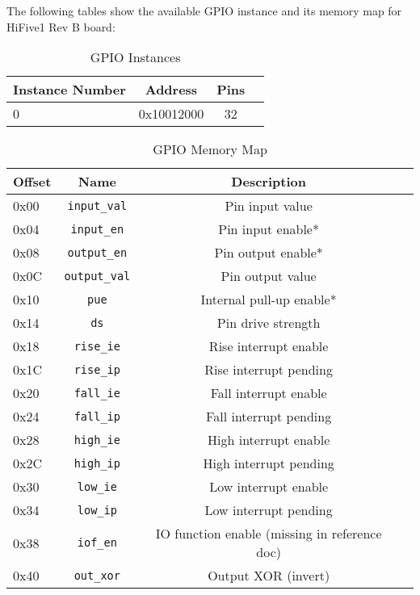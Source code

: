 The following tables show the available GPIO instance and its memory map for HiFive1 Rev B board:
\begin{table}[H]
    \centering
    \begin{tabular}{| p{3cm} | c | c | p{3cm} |}
        \hline
        \textbf{Instance Number} & \textbf{Address} & \textbf{Pins}\\
        \hline
        \hline
        0 & 0x10012000 & 32\\
        \hline
    \end{tabular}
    \caption{GPIO Instances}
\end{table}

\begin{table}[H]
    \centering
    \begin{tabular}{| p{3cm} | c | c | p{3cm} |}
        \hline
        \textbf{Offset} & \textbf{Name} & \textbf{Description}\\
        \hline
        \hline
        0x00 & \lstinline|input_val| & Pin input value\\
        0x04 & \lstinline|input_en| & Pin input enable*\\
        0x08 & \lstinline|output_en| & Pin output enable*\\
        0x0C & \lstinline|output_val| & Pin output value\\
        0x10 & \lstinline|pue| & Internal pull-up enable*\\
        0x14 & \lstinline|ds| & Pin drive strength\\
        0x18 & \lstinline|rise_ie| & Rise interrupt enable\\
        0x1C & \lstinline|rise_ip| & Rise interrupt pending\\
        0x20 & \lstinline|fall_ie| & Fall interrupt enable\\
        0x24 & \lstinline|fall_ip| & Fall interrupt pending\\
        0x28 & \lstinline|high_ie| & High interrupt enable\\
        0x2C & \lstinline|high_ip| & High interrupt pending\\
        0x30 & \lstinline|low_ie| & Low interrupt enable\\
        0x34 & \lstinline|low_ip| & Low interrupt pending\\
        0x38 & \lstinline|iof_en| & IO function enable (missing in reference doc)\\
        0x40 & \lstinline|out_xor| & Output XOR (invert)\\
        \hline
    \end{tabular}
    \caption{GPIO Memory Map}
    \label{tab:gpio_memory_map}
\end{table}

